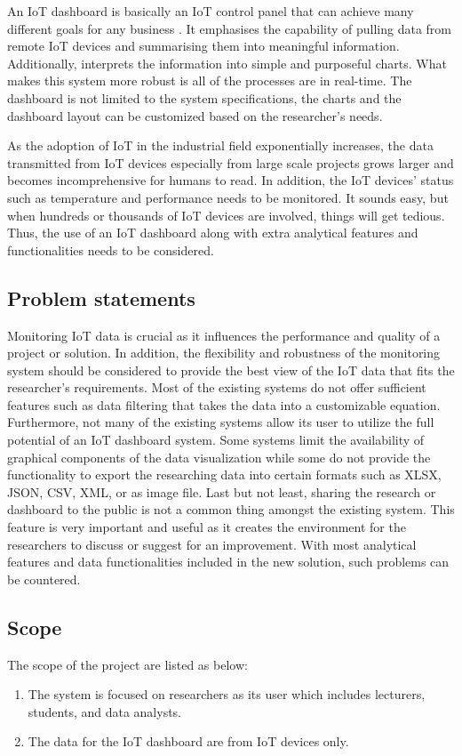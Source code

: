 \documentclass[conference]{IEEEtran}
\begin{document}
An IoT dashboard is basically an IoT control panel that can achieve many different goals for
any business \cite{b3}. It emphasises the capability of pulling data from remote IoT devices and
summarising them into meaningful information. Additionally, interprets the information into
simple and purposeful charts. What makes this system more robust is all of the processes
are in real-time. The dashboard is not limited to the system specifications, the charts
and the dashboard layout can be customized based on the researcher's needs. 

As the adoption of IoT in the industrial field exponentially increases, the data transmitted
from IoT devices especially from large scale projects grows larger and becomes incomprehensive
for humans to read. In addition, the IoT devices' status such as temperature and performance
needs to be monitored. It sounds easy, but when hundreds or thousands of IoT devices
are involved, things will get tedious. Thus, the use of an IoT dashboard along with
extra analytical features and functionalities needs to be considered.

\subsection{Problem statements}
Monitoring IoT data is crucial as it influences the performance and quality of a project 
or solution. In addition, the flexibility and robustness of the monitoring system should 
be considered to provide the best view of the IoT data that fits the researcher’s 
requirements. Most of the existing systems do not offer sufficient features such as 
data filtering that takes the data into a customizable equation. Furthermore, not many 
of the existing systems allow its user to utilize the full potential of an IoT dashboard 
system. Some systems limit the availability of graphical components of the data 
visualization while some do not provide the functionality to export the researching 
data into certain formats such as XLSX, JSON, CSV, XML, or as image file. 
Last but not least, sharing the research or dashboard to the public is not a 
common thing amongst the existing system. This feature is very important and 
useful as it creates the environment for the researchers to discuss or suggest 
for an improvement. With most analytical features and data functionalities included 
in the new solution, such problems can be countered.

\subsection{Scope}
The scope of the project are listed as below:
\begin{enumerate}
    \item The system is focused on researchers as its user which includes lecturers, students, and data analysts.
    \item The data for the IoT dashboard are from IoT devices only.
\end{enumerate}
\end{document}
